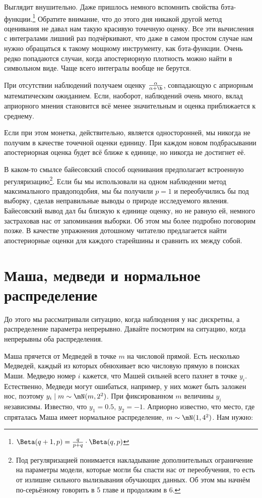 Выглядит внушительно. Даже пришлось немного вспомнить свойства бэта-функции.\footnote{$\Beta(q+1, p) = \frac{q}{p+q} \cdot \Beta(q,p)$}  Обратите внимание, что до этого дня никакой другой метод оценивания не давал нам такую красивую точечную оценку. Все эти вычисления с интегралами лишний раз подчёркивают, что даже в самом простом случае нам нужно обращаться к такому мощному инструменту, как бэта-функции. Очень редко попадаются случаи, когда апостериорную плотность можно найти в символьном виде. Чаще всего интегралы вообще не берутся.  

При отсутствии наблюдений получаем оценку $\frac{\alpha}{\alpha + \b}$, совпадающую с априорным математическим ожиданием. Если, наоборот, наблюдений очень много, вклад априорного мнения становится всё менее значительным и оценка приближается к среднему. 

Если при этом монетка, действительно, является односторонней, мы никогда не получим в качестве точечной оценки единицу. При каждом новом подбрасывании апостериорная оценка будет всё ближе к единице, но никогда не достигнет её.  

В каком-то смылсе байесовский способ оценивания предполагает встроенную регуляризацию\footnote{Под регуляризацией понимается накладывание дополнительных ограничение на параметры модели, которые могли бы спасти нас от переобучения, то есть от излишне сильного вылизывания обучающих данных. Об этом мы начнём по-серьёзному говорить в 5 главе и продолжим в 6.}. Если бы мы использовали на одном наблюдении метод максимального правдоподобия, мы бы получили $p=1$ и переобучились бы под выборку, сделав неправильные выводы о природе исследуемого явления. Байесовский вывод дал бы близкую к единице оценку, но не равную ей, немного застраховав нас от запоминания выборки.  Об этом мы более подробно поговорим позже.  В качестве упражнения дотошному читателю предлагается найти апостериорные оценки для каждого старейшины и сравнить их между собой.

\section{Маша, медведи и нормальное распределение}

До этого мы рассматривали ситуацию, когда наблюдения у нас дискретны, а распределение параметра непрерывно. Давайте посмотрим на ситуацию, когда непрерывны оба распределения. 

Маша прячется от Медведей в точке $m$ на числовой прямой. Есть несколько Медведей, каждый из которых обнюхивает всю числовую прямую в поисках Маши. Медведю номер $i$ кажется, что Машей сильней всего пахнет в точке $y_i$. Естественно, Медведи могут ошибаться, например, у них может быть заложен нос, поэтому $y_i \mid m \sim \mN(m, 2^2)$. При фиксированном $m$ величины $y_i$ независимы. Известно, что $y_1 = 0.5$, $y_2 = −1$.  Априорно известно, что место, где спряталась Маша имеет нормальное распределение, $m \sim \mN(1, 4^2)$. Нам нужно:

